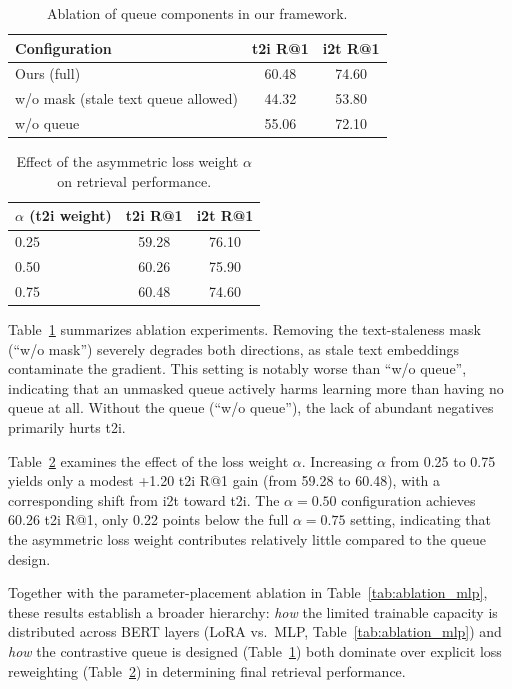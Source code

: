\documentclass[10pt,leqno]{amsart}
\begin{document}
\begin{table}[h]
\centering
\begin{tabular}{lcc}
\toprule
Configuration & t2i R@1 & i2t R@1 \\
\midrule
Ours (full) & 60.48 & 74.60 \\
w/o mask (stale text queue allowed) & 44.32 & 53.80 \\
w/o queue & 55.06 & 72.10 \\
\bottomrule
\end{tabular}
\caption{Ablation of queue components in our framework.}
\label{tab:ablation}
\end{table}

\begin{table}[h]
\centering
\begin{tabular}{lcc}
\toprule
$\alpha$ (t2i weight) & t2i R@1 & i2t R@1 \\
\midrule
0.25 & 59.28 & 76.10 \\
0.50 & 60.26 & 75.90 \\
0.75 & 60.48 & 74.60 \\
\bottomrule
\end{tabular}
\caption{Effect of the asymmetric loss weight $\alpha$ on retrieval performance.}
\label{tab:alpha}
\end{table}

Table~\ref{tab:ablation} summarizes ablation experiments. Removing the text-staleness mask (``w/o mask'') severely degrades both directions, as stale text embeddings contaminate the gradient. This setting is notably worse than ``w/o queue'', indicating that an unmasked queue actively harms learning more than having no queue at all. Without the queue (``w/o queue''), the lack of abundant negatives primarily hurts t2i.

Table~\ref{tab:alpha} examines the effect of the loss weight $\alpha$. Increasing $\alpha$ from 0.25 to 0.75 yields only a modest +1.20 t2i R@1 gain (from 59.28 to 60.48), with a corresponding shift from i2t toward t2i. The $\alpha{=}0.50$ configuration achieves 60.26 t2i R@1, only 0.22 points below the full $\alpha{=}0.75$ setting, indicating that the asymmetric loss weight contributes relatively little compared to the queue design.

Together with the parameter-placement ablation in Table~\ref{tab:ablation_mlp}, these results establish a broader hierarchy: \emph{how} the limited trainable capacity is distributed across BERT layers (LoRA vs.\ MLP, Table~\ref{tab:ablation_mlp}) and \emph{how} the contrastive queue is designed (Table~\ref{tab:ablation}) both dominate over explicit loss reweighting (Table~\ref{tab:alpha}) in determining final retrieval performance.
\end{document}
